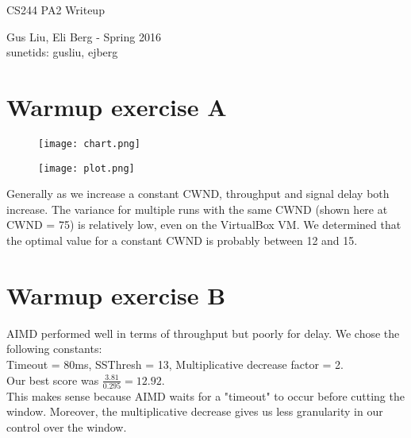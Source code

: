 \documentclass[12pt]{article}
\begin{document}
\begin{center}
{\Large CS244 PA2 Writeup}
\begin{center}
Gus Liu, Eli Berg - Spring 2016 \\
sunetids: gusliu, ejberg
\end{center} 
\end{center}

\section*{Warmup exercise A}

\begin{figure}[h!]
  \texttt{[image: chart.png]}
\end{figure}
\begin{figure}[h!]
  \texttt{[image: plot.png]}
\end{figure}

Generally as we increase a constant CWND, throughput and signal delay both increase. The variance for multiple runs with the same CWND (shown here at CWND = 75) is relatively low, even on the VirtualBox VM. We determined that the optimal value for a constant CWND is probably between 12 and 15.
	
	
	\pagebreak[4]
\section*{Warmup exercise B}
AIMD performed well in terms of throughput but poorly for delay. We chose the following constants:\\
Timeout = 80ms, 
SSThresh = 13, 
Multiplicative decrease factor = 2.\\
Our best score was $\frac{3.81}{0.295} = 12.92$. \\

This makes sense because AIMD waits for a "timeout" to occur before cutting the window. Moreover, the multiplicative decrease gives us less granularity in our control over the window. 
	
\end{document}
